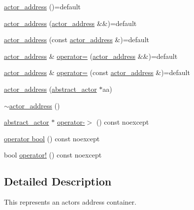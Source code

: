 \begin{DoxyCompactItemize}
\item 
\hyperlink{classactor__zeta_1_1actor_1_1actor__address_a705d1dec648101e924ae7bde7f0fc53b}{actor\+\_\+address} ()=default
\item 
\hyperlink{classactor__zeta_1_1actor_1_1actor__address_adefe77fbf1b1aae3fd10a6fb6de44e1f}{actor\+\_\+address} (\hyperlink{classactor__zeta_1_1actor_1_1actor__address}{actor\+\_\+address} \&\&)=default
\item 
\hyperlink{classactor__zeta_1_1actor_1_1actor__address_aa1a88179e60fc39b3b605d8fafd81263}{actor\+\_\+address} (const \hyperlink{classactor__zeta_1_1actor_1_1actor__address}{actor\+\_\+address} \&)=default
\item 
\hyperlink{classactor__zeta_1_1actor_1_1actor__address}{actor\+\_\+address} \& \hyperlink{classactor__zeta_1_1actor_1_1actor__address_ad8e82a779aea63a40c76fe4c29e77de7}{operator=} (\hyperlink{classactor__zeta_1_1actor_1_1actor__address}{actor\+\_\+address} \&\&)=default
\item 
\hyperlink{classactor__zeta_1_1actor_1_1actor__address}{actor\+\_\+address} \& \hyperlink{classactor__zeta_1_1actor_1_1actor__address_a016b9e59e47d99e8b4c3f6e6e0af11c1}{operator=} (const \hyperlink{classactor__zeta_1_1actor_1_1actor__address}{actor\+\_\+address} \&)=default
\item 
\hyperlink{classactor__zeta_1_1actor_1_1actor__address_acc61d865d7d5280dbd67477d59863714}{actor\+\_\+address} (\hyperlink{classactor__zeta_1_1actor_1_1abstract__actor}{abstract\+\_\+actor} $\ast$aa)
\item 
\hyperlink{classactor__zeta_1_1actor_1_1actor__address_abcf0f095f1aee2c31430cab429338894}{$\sim$actor\+\_\+address} ()
\item 
\hyperlink{classactor__zeta_1_1actor_1_1abstract__actor}{abstract\+\_\+actor} $\ast$ \hyperlink{classactor__zeta_1_1actor_1_1actor__address_aa7f604d31c77a4558d6318aaa605b967}{operator-\/$>$} () const noexcept
\item 
\hyperlink{classactor__zeta_1_1actor_1_1actor__address_ac0c1632af8623f4d544be8633116dfd2}{operator bool} () const noexcept
\item 
bool \hyperlink{classactor__zeta_1_1actor_1_1actor__address_a9d599ce506516362492146b80fe312ba}{operator!} () const noexcept
\end{DoxyCompactItemize}


\subsection{Detailed Description}
This represents an actor\textquotesingle{}s address container. 

